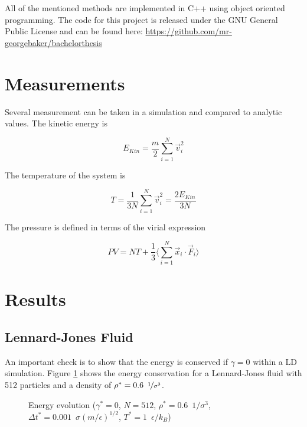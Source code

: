 \documentclass[a4paper]{article}
\begin{document}
All of the mentioned methods are implemented in C++ using object oriented programming. The code for this project is released under the GNU General Public License and can be found here: \href{https://github.com/mr-georgebaker/bachelorthesis}{https://github.com/mr-georgebaker/bachelorthesis}

\newpage

\section{Measurements}

Several measurement can be taken in a simulation and compared to analytic values. The kinetic energy is

\begin{equation}
E_{Kin} = \frac{m}{2} \sum_{i=1}^N \vec{v}_i^2
\end{equation}

The temperature of the system is

\begin{equation}
T = \frac{1}{3 N} \sum_{i=1}^N \vec{v}_i^2 = \frac{2 E_{Kin}}{3 N}
\end{equation}

The pressure is defined in terms of the virial expression~\cite{M.Doi1988}

\begin{equation}
P V = N T + \frac{1}{3} \Big \langle \sum_{i=1}^N \vec{x}_i \cdot \vec{F}_i \Big \rangle
\end{equation}

\section{Results}
\label{sec:result}

\subsection{Lennard-Jones Fluid}

An important check is to show that the energy is conserved if $\gamma = 0$ within a LD simulation. Figure \ref{im:total_energy} shows the energy conservation for a Lennard-Jones fluid with 512 particles and a density of $\rho^* = 0.6 \enspace \nicefrac{1}{\sigma^3}$. 

\begin{figure} [H]
\centering
\scalebox{1.1}{}
\caption{Energy evolution ($\gamma^* = 0$, $N = 512$, $\rho^* = 0.6 \enspace 1/\sigma^3$, $\Delta t^* = 0.001 \enspace \sigma (m/\epsilon)^{1/2}$, $T^* = 1 \enspace \epsilon/k_B$)}
\label{im:total_energy}
\end{figure}
\end{document}
